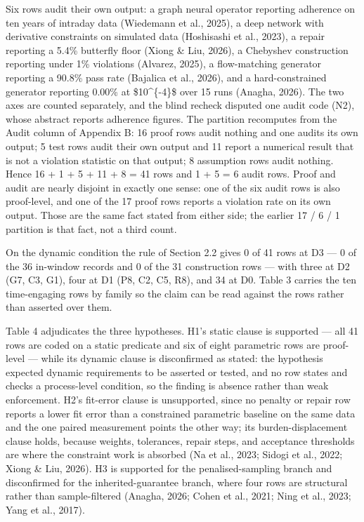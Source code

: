\documentclass[11pt]{article}
\begin{document}
Six rows audit their own output: a graph neural operator reporting adherence on ten years of intraday data (Wiedemann et al., 2025), a deep network with derivative constraints on simulated data (Hoshisashi et al., 2023), a repair reporting a 5.4\% butterfly floor (Xiong \& Liu, 2026), a Chebyshev construction reporting under 1\% violations (Alvarez, 2025), a flow-matching generator reporting a 90.8\% pass rate (Bajalica et al., 2026), and a hard-constrained generator reporting 0.00\% at \$10\textasciicircum{}\{-4\}\$ over 15 runs (Anagha, 2026). The two axes are counted separately, and the blind recheck disputed one audit code (N2), whose abstract reports adherence figures. The partition recomputes from the Audit column of Appendix B: 16 proof rows audit nothing and one audits its own output; 5 test rows audit their own output and 11 report a numerical result that is not a violation statistic on that output; 8 assumption rows audit nothing. Hence 16 + 1 + 5 + 11 + 8 = 41 rows and 1 + 5 = 6 audit rows. Proof and audit are nearly disjoint in exactly one sense: one of the six audit rows is also proof-level, and one of the 17 proof rows reports a violation rate on its own output. Those are the same fact stated from either side; the earlier 17 / 6 / 1 partition is that fact, not a third count.

On the dynamic condition the rule of Section 2.2 gives 0 of 41 rows at D3 — 0 of the 36 in-window records and 0 of the 31 construction rows — with three at D2 (G7, C3, G1), four at D1 (P8, C2, C5, R8), and 34 at D0. Table 3 carries the ten time-engaging rows by family so the claim can be read against the rows rather than asserted over them.

Table 4 adjudicates the three hypotheses. H1's static clause is supported — all 41 rows are coded on a static predicate and six of eight parametric rows are proof-level — while its dynamic clause is disconfirmed as stated: the hypothesis expected dynamic requirements to be asserted or tested, and no row states and checks a process-level condition, so the finding is absence rather than weak enforcement. H2's fit-error clause is unsupported, since no penalty or repair row reports a lower fit error than a constrained parametric baseline on the same data and the one paired measurement points the other way; its burden-displacement clause holds, because weights, tolerances, repair steps, and acceptance thresholds are where the constraint work is absorbed (Na et al., 2023; Sidogi et al., 2022; Xiong \& Liu, 2026). H3 is supported for the penalised-sampling branch and disconfirmed for the inherited-guarantee branch, where four rows are structural rather than sample-filtered (Anagha, 2026; Cohen et al., 2021; Ning et al., 2023; Yang et al., 2017).
\end{document}

